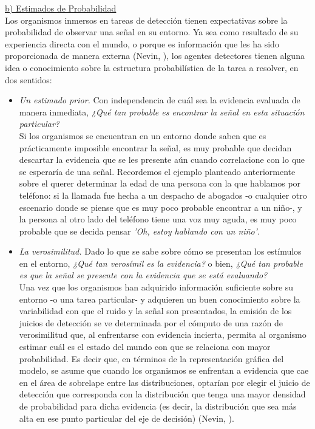       \underline{b) Estimados de Probabilidad}\\

Los organismos inmersos en tareas de detección tienen expectativas sobre la probabilidad de observar una señal en su entorno. Ya sea como resultado de su experiencia directa con el mundo, o porque es información que les ha sido proporcionada de manera externa (Nevin, \citeyear{Nevin1969}), los agentes detectores tienen alguna idea o conocimiento sobre la estructura probabilística de la tarea a resolver, en dos sentidos: 

\begin{itemize}
\item \textsl{Un estimado prior.} Con independencia de cuál sea la evidencia evaluada de manera inmediata, \textit{¿Qué tan probable es encontrar la señal en esta situación particular?}\\

Si los organismos se encuentran en un entorno donde saben que es prácticamente imposible encontrar la señal, es muy probable que decidan descartar la evidencia que se les presente aún cuando correlacione con lo que se esperaría de una señal. Recordemos el ejemplo planteado anteriormente sobre el querer determinar la edad de una persona con la que hablamos por teléfono: si la llamada fue hecha a un despacho de abogados -o cualquier otro escenario donde se piense que es muy poco probable encontrar a un niño-, y la persona al otro lado del teléfono tiene una voz muy aguda, es muy poco probable que se decida pensar \textit{'Oh, estoy hablando con un niño'}.\\

\item \textsl{La verosimilitud.} Dado lo que se sabe sobre cómo se presentan los estímulos en el entorno, \textit{¿Qué tan verosímil es la evidencia?} o bien, \textit{¿Qué tan probable es que la señal se presente con la evidencia que se está evaluando?}\\

Una vez que los organismos han adquirido información suficiente sobre su entorno -o una tarea particular- y adquieren un buen conocimiento sobre la variabilidad con que el ruido y la señal son presentados, la emisión de los juicios de detección se ve determinada por el cómputo de una razón de verosimilitud que, al enfrentarse con evidencia incierta, permita al organismo estimar cuál es el estado del mundo con que se relaciona con mayor probabilidad. Es decir que, en términos de la representación gráfica del modelo, se asume que cuando los organismos se enfrentan a evidencia que cae en el área de sobrelape entre las distribuciones, optarían por elegir el juicio de detección que corresponda con la distribución que tenga una mayor densidad de probabilidad para dicha evidencia (es decir, la distribución que sea más alta en ese punto particular del eje de decisión) (Nevin, \citeyear{Nevin1969}).\\
\end{itemize}

